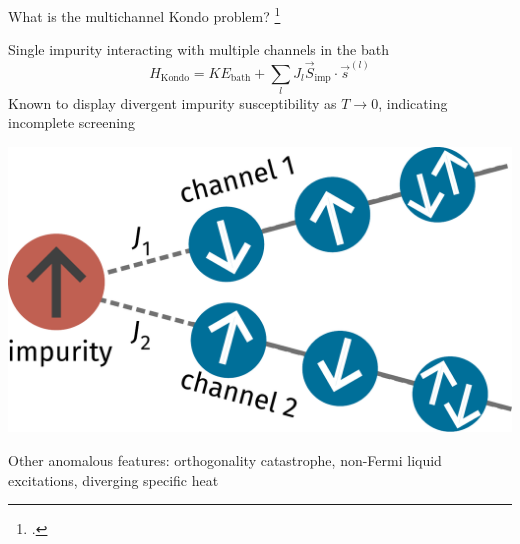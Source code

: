 \documentclass[10pt,aspectratio=169]{beamer}
\begin{document}
\begin{frame}{What is the multichannel Kondo problem?}
\footcite{Noz_blandin_1980,affleck1993exact,emery_kivelson,andrei_destri_1984}
\begin{minipage}{0.39\textwidth}
Single impurity interacting with \alert{multiple channels} in the bath
\[H_\text{Kondo} = KE_\text{bath} + \sum_{l}J_l \vec{S}_\text{imp}\cdot\vec{s}^{(l)}\]
Known to display divergent impurity susceptibility as \(T \to 0\), indicating \alert{incomplete screening}
\end{minipage}
\hspace*{\fill}
\begin{minipage}{0.45\textwidth}
\includegraphics[width=\textwidth]{MCKM.pdf}
\end{minipage}
\vspace*{\fill}

Other anomalous features: orthogonality catastrophe, \alert{non-Fermi liquid} excitations, diverging specific heat
\end{frame}
\end{document}
